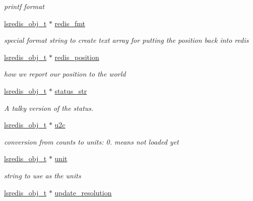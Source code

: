 \begin{DoxyCompactItemize}
\begin{DoxyCompactList}\small\item\em printf format \end{DoxyCompactList}\item 
\hyperlink{pgpmac_8h_ad449de06d02791adf2498d2a1e1f909c}{lsredis\-\_\-obj\-\_\-t} $\ast$ \hyperlink{structlspmac__motor__struct_a91c38b2072d878b71f4e77de2f1375a4}{redis\-\_\-fmt}
\begin{DoxyCompactList}\small\item\em special format string to create text array for putting the position back into redis \end{DoxyCompactList}\item 
\hyperlink{pgpmac_8h_ad449de06d02791adf2498d2a1e1f909c}{lsredis\-\_\-obj\-\_\-t} $\ast$ \hyperlink{structlspmac__motor__struct_af94a0b2611136058ead4948fd7c858e3}{redis\-\_\-position}
\begin{DoxyCompactList}\small\item\em how we report our position to the world \end{DoxyCompactList}\item 
\hyperlink{pgpmac_8h_ad449de06d02791adf2498d2a1e1f909c}{lsredis\-\_\-obj\-\_\-t} $\ast$ \hyperlink{structlspmac__motor__struct_aa0a6bed8379c5b1f90a4eb826cde9136}{status\-\_\-str}
\begin{DoxyCompactList}\small\item\em A talky version of the status. \end{DoxyCompactList}\item 
\hyperlink{pgpmac_8h_ad449de06d02791adf2498d2a1e1f909c}{lsredis\-\_\-obj\-\_\-t} $\ast$ \hyperlink{structlspmac__motor__struct_a8838915ebb6f9989944117c8197d5e86}{u2c}
\begin{DoxyCompactList}\small\item\em conversion from counts to units\-: 0. means not loaded yet \end{DoxyCompactList}\item 
\hyperlink{pgpmac_8h_ad449de06d02791adf2498d2a1e1f909c}{lsredis\-\_\-obj\-\_\-t} $\ast$ \hyperlink{structlspmac__motor__struct_af8e6eb1df6b0d343fc4da93fbdd63133}{unit}
\begin{DoxyCompactList}\small\item\em string to use as the units \end{DoxyCompactList}\item 
\hyperlink{pgpmac_8h_ad449de06d02791adf2498d2a1e1f909c}{lsredis\-\_\-obj\-\_\-t} $\ast$ \hyperlink{structlspmac__motor__struct_aefa84c7592369090eec8b211caaa3a51}{update\-\_\-resolution}

\end{DoxyCompactItemize}
